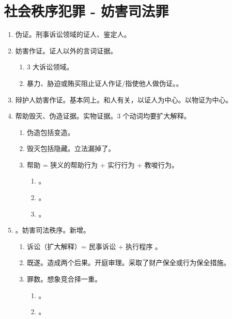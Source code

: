 \section{社会秩序犯罪 - 妨害司法罪}
\begin{enumerate}
  \item 伪证。刑事诉讼领域的证人、鉴定人。
  \item 妨害作证。证人以外的言词证据。
        \begin{enumerate}
          \item 3 大诉讼领域。
          \item 暴力、胁迫或贿买阻止证人作证/指使他人做伪证。。
        \end{enumerate}
  \item 辩护人妨害作证。基本同上。\sjt 和人有关，以证人为中心。\xjt 以物证为中心。
  \item 帮助毁灭、伪造证据。实物证据。3 个动词均要扩大解释。
        \begin{enumerate}
          \item 伪造包括变造。
          \item 毁灭包括隐藏。立法漏掉了。
          \item 帮助 = 狭义的帮助行为 + 实行行为 + 教唆行为。
                \begin{enumerate}
                  \item {}。
                  \item {}。
                  \item {}。
                \end{enumerate}
        \end{enumerate}
  \item {}。妨害司法秩序。新增。
        \begin{enumerate}
          \item 诉讼（扩大解释）= 民事诉讼 + 执行程序 。
          \item 既遂。造成两个后果。\yi 开庭审理。\er 采取了财产保全或行为保全措施。
          \item 罪数。想象竞合择一重。
                \begin{enumerate}
                  \item {}。
                  \item {}。

\end{enumerate}
\end{enumerate}
\end{enumerate}
